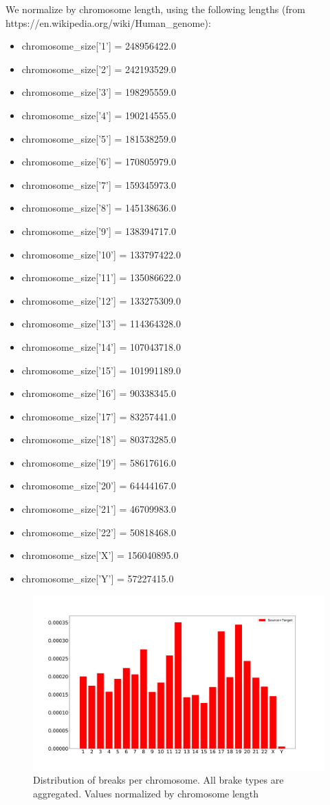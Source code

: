 \documentclass[a4paper,10pt]{article}
\begin{document}
We normalize by chromosome length, using the following lengths (from https://en.wikipedia.org/wiki/Human\_genome):
\begin{itemize}
\item chromosome\_size['1'] =  248956422.0
\item chromosome\_size['2'] =  242193529.0
\item chromosome\_size['3'] =  198295559.0
\item chromosome\_size['4'] =  190214555.0
\item chromosome\_size['5'] =  181538259.0
\item chromosome\_size['6'] =  170805979.0
\item chromosome\_size['7'] =  159345973.0
\item chromosome\_size['8'] =  145138636.0
\item chromosome\_size['9'] =  138394717.0
\item chromosome\_size['10'] = 133797422.0
\item chromosome\_size['11'] = 135086622.0
\item chromosome\_size['12'] = 133275309.0
\item chromosome\_size['13'] = 114364328.0
\item chromosome\_size['14'] = 107043718.0
\item chromosome\_size['15'] = 101991189.0
\item chromosome\_size['16'] = 90338345.0
\item chromosome\_size['17'] = 83257441.0
\item chromosome\_size['18'] = 80373285.0
\item chromosome\_size['19'] = 58617616.0
\item chromosome\_size['20'] = 64444167.0
\item chromosome\_size['21'] = 46709983.0
\item chromosome\_size['22'] = 50818468.0
\item chromosome\_size['X'] =  156040895.0
\item chromosome\_size['Y'] =  57227415.0
\end{itemize}

\begin{figure}[H]
\includegraphics[scale=0.2]{figures/All_Break_distribution_normalized.pdf}
\caption{Distribution of breaks per chromosome. All brake types are aggregated. Values normalized by chromosome length}
\end{figure}
\end{document}
